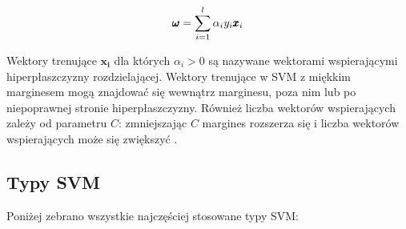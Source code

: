 \documentclass[paper=a4, fontsize=11pt]{scrartcl} %
\numberwithin{equation}{section} %
\numberwithin{figure}{section} %
\begin{document}
    \begin{equation} \label{eq:dual_constraint}
        \pmb{\omega}=\sum\limits_{i=1}^{l} \alpha_i y_i \pmb{x}_i \\
    \end{equation}

    \par Wektory trenujące $\pmb{x_i}$ dla których $\alpha_i > 0$ są nazywane wektorami
    wspierającymi hiperpłaszczyzny rozdzielającej. Wektory trenujące w SVM z miękkim marginesem
    mogą znajdować się wewnątrz marginesu, poza nim lub po niepoprawnej stronie
    hiperpłaszczyzny. Również liczba wektorów wspierających zależy od parametru $C$:
    zmniejszając $C$ margines rozszerza się i liczba wektorów wspierających może się zwiększyć
    \cite{nefedov2016support}.

\newpage
\subsection{Typy SVM}
Poniżej zebrano wszystkie najczęściej stosowane typy SVM:
\end{document}
